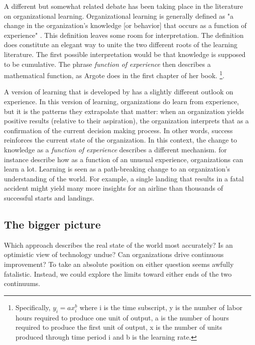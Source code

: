 \documentclass[12pt, man, natbib]{apa6}
\begin{document}
	A different but somewhat related debate has been taking place in the literature on organizational learning. Organizational learning is generally defined as "a change in the organization's knowledge [or behavior] that occurs as a function of experience" \citep[31]{Argote2013b}. This definition leaves some room for interpretation. The definition does constitute an elegant way to unite the two different roots of the learning literature. The first possible interpretation would be that knowledge is supposed to be cumulative. The phrase \textit{function of experience} then describes a mathematical function, as Argote does in the first chapter of her book.
	\footnote{Specifically, $y_i = ax^b_i$ where i is the time subscript, y is the number of labor hours required to produce one unit of output, a is the number of hours required to produce the first unit of output, x is the number of units produced through time period i and b is the learning rate.\citep[11]{Argote2013a}}.
	
	A version of learning that is developed by \citet{Levinthal1993} has a slightly different outlook on experience. In this version of learning, organizations do learn from experience, but it is the patterns they extrapolate that matter: when an organization yields positive results (relative to their aspiration), the organization interprets that as a confirmation of the current decision making process. In other words, success reinforces the current state of the organization. In this context, the change to knowledge as a \textit{function of experience} describes a different mechanism. \citet{March1991} for instance describe how as a function of an unusual experience, organizations can learn a lot. Learning is seen as a path-breaking change to an organization's understanding of the world. For example, a single landing that results in a fatal accident might yield many more insights for an airline than thousands of successful starts and landings.
	
	\subsection{The bigger picture}
	
	Which approach describes the real state of the world most accurately? Is an optimistic view of technology undue? Can organizations drive continuous improvement? To take an absolute position on either question seems awfully fatalistic. Instead, we could explore the limits toward either ends of the two continuums. 
	
\end{document}
